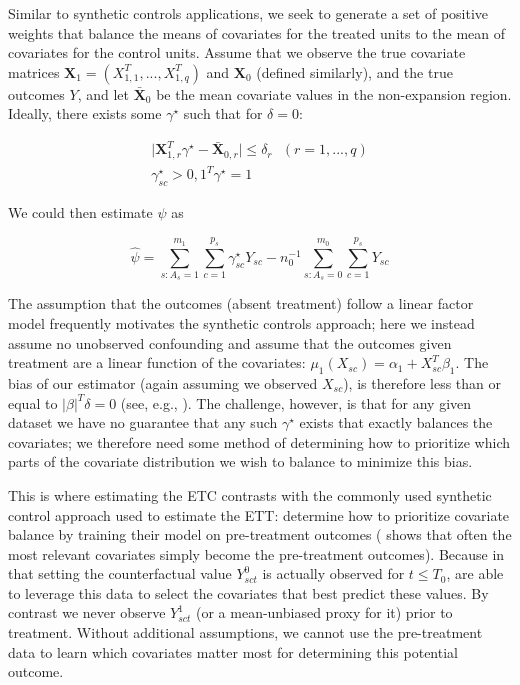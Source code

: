 \documentclass[aoas]{imsart}
\theoremstyle{plain}
\newcommand{\matr}[1]{\mathbf{#1}} %
\theoremstyle{remark}
\begin{document}
Similar to synthetic controls applications, we seek to generate a set of positive weights that balance the means of covariates for the treated units to the mean of covariates for the control units. Assume that we observe the true covariate matrices $\matr{X}_1 = (X_{1,1}^T, ..., X_{1, q}^T)$ and $\matr{X}_0$ (defined similarly), and the true outcomes $Y$, and let $\bar{\matr{X}}_0$ be the mean covariate values in the non-expansion region. Ideally, there exists some $\gamma^\star$ such that for $\delta = 0$: 

\begin{align*}
\lvert \matr{X}_{1, r}^T\gamma^\star - \bar{\matr{X}}_{0, r} \lvert \le \delta_r \ \ \ (r = 1, ..., q) \\
\gamma_{sc}^\star > 0, 1^T\gamma^\star = 1
\end{align*}

We could then estimate $\psi$ as

\begin{equation}\label{eqn:psi}
\hat{\psi} = \sum_{s: A_s = 1}^{m_1}\sum_{c = 1}^{p_s}\gamma_{sc}^\star Y_{sc} - n_0^{-1}\sum_{s: A_s = 0}^{m_0}\sum_{c = 1}^{p_s}Y_{sc}
\end{equation}

The assumption that the outcomes (absent treatment) follow a linear factor model frequently motivates the synthetic controls approach; here we instead assume no unobserved confounding and assume that the outcomes given treatment are a linear function of the covariates: $\mu_1(X_{sc}) = \alpha_1 + X_{sc}^T\beta_1$. The bias of our estimator (again assuming we observed $X_{sc}$), is therefore less than or equal to $\lvert\beta\rvert^T\delta = 0$ (see, e.g., \cite{zubizarreta2015stable}). The challenge, however, is that for any given dataset we have no guarantee that any such $\gamma^\star$ exists that exactly balances the covariates; we therefore need some method of determining how to prioritize which parts of the covariate distribution we wish to balance to minimize this bias.

This is where estimating the ETC contrasts with the commonly used synthetic control approach used to estimate the ETT: \cite{abadie2010synthetic} determine how to prioritize covariate balance by training their model on pre-treatment outcomes (\cite{kaul2015synthetic} shows that often the most relevant covariates simply become the pre-treatment outcomes). Because in that setting the counterfactual value $Y^0_{sct}$ is actually observed for $t \le T_0$, \cite{abadie2010synthetic} are able to leverage this data to select the covariates that best predict these values. By contrast we never observe $Y^1_{sct}$ (or a mean-unbiased proxy for it) prior to treatment. Without additional assumptions, we cannot use the pre-treatment data to learn which covariates matter most for determining this potential outcome.
\end{document}
